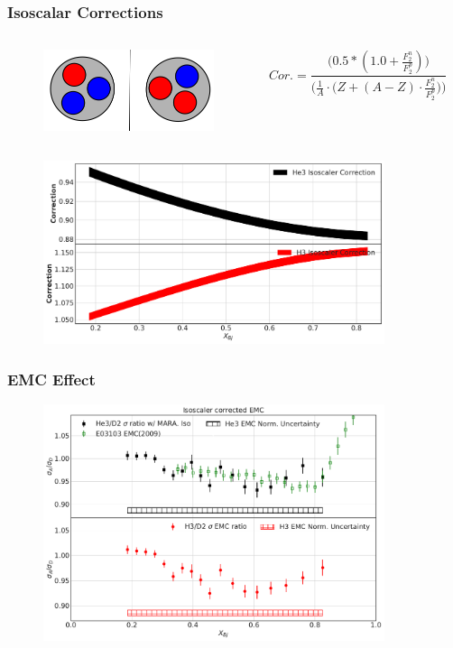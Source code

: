 \documentclass[12pt]{beamer}
\begin{document}
\begin{frame}{}
\frametitle{Isoscalar Corrections}
\vspace*{-1cm}
\begin{columns}
\begin{figure}
	\includegraphics[width =5cm]{../images/mirror}
\end{figure}
\begin{equation}
Cor. = \frac{\Big(0.5*(1.0 + \frac{F_2^n}{F_2^p})\Big)}{ \Big(\frac{1}{A} \cdot \big(Z+(A-Z)\cdot \frac{F_2^n}{F_2^p}\big) \Big) }\nonumber
\end{equation}
\end{columns}

\begin{figure}
	\includegraphics[width =10cm]{../images/IsoCor.pdf}
\end{figure}

\end{frame}
\begin{frame}{}
\frametitle{EMC Effect}
\begin{figure}
	\includegraphics[width=10cm]{../images/EMCIsotwo.pdf}
\end{figure}
\end{frame}
\end{document}
